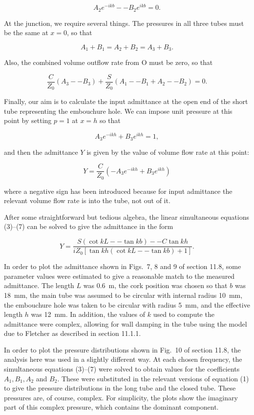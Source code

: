   $$A_2 e^{-ikb} -- B_2 e^{ikb} =0. \tag{4}$$ 

  At the junction, we require several things. The pressures in all three tubes 
  must be the same at $x=0$, so that 

  $$A_1+B_1 = A_2 + B_2 = A_3 + B_3 . \tag{5}$$ 

  Also, the combined volume outflow rate from O must be zero, so that 

  $$\dfrac{C}{Z_0}(A_3 -- B_3) + \dfrac{S}{Z_0}(A_1 -- B_1 + A_2 -- B_2) = 0 . 
  \tag{6}$$ 

  Finally, our aim is to calculate the input admittance at the open end of the 
  short tube representing the embouchure hole. We can impose unit pressure at 
  this point by setting $p=1$ at $x=h$ so that 

  $$A_3 e^{-ikh} + B_3 e^{ikh} =1, \tag{7}$$ 

  and then the admittance $Y$ is given by the value of volume flow rate at this 
  point: 

  $$Y=\dfrac{C}{Z_0}\left( -A_3 e^{-ikh} + B_3 e^{ikh} \right) \tag{8}$$ 

  where a negative sign has been introduced because for input admittance the 
  relevant volume flow rate is into the tube, not out of it. 

  After some straightforward but tedious algebra, the linear simultaneous 
  equations (3)--(7) can be solved to give the admittance in the form 

  $$Y = \dfrac{S (\cot kL -- \tan kb ) -- C \tan kh}{i Z_0 \left[ \tan kh (\cot 
  kL -- \tan kb ) +1 \right]} . \tag{9}$$ 

  In order to plot the admittance shown in Figs.\ 7, 8 and 9 of section 11.8, 
  some parameter values were estimated to give a reasonable match to the 
  measured admittance. The length $L$ was 0.6 m, the cork position was chosen 
  so that $b$ was 18 mm, the main tube was assumed to be circular with internal 
  radius 10 mm, the embouchure hole was taken to be circular with radius 5 mm, 
  and the effective length $h$ was 12 mm. In addition, the values of $k$ used 
  to compute the admittance were complex, allowing for wall damping in the tube 
  using the model due to Fletcher as described in section 11.1.1. 

  In order to plot the pressure distributions shown in Fig.\ 10 of section 
  11.8, the analysis here was used in a slightly different way. At each chosen 
  frequency, the simultaneous equations (3)--(7) were solved to obtain values 
  for the coefficients $A_1, B_1, A_2$ and $B_2$. These were substituted in the 
  relevant versions of equation (1) to give the pressure distributions in the 
  long tube and the closed tube. These pressures are, of course, complex. For 
  simplicity, the plots show the imaginary part of this complex pressure, which 
  contains the dominant component. 